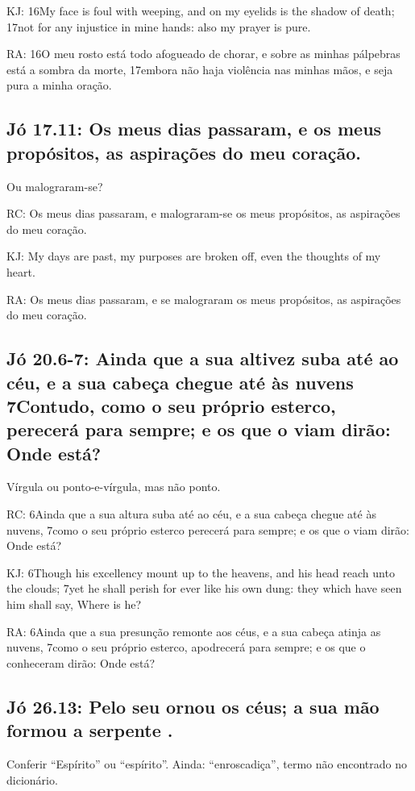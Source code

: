 KJ: 16My face is foul with weeping, and on my eyelids is the shadow of death; 17not for any injustice in mine hands: also my prayer is pure.

RA: 16O meu rosto está todo afogueado de chorar, e sobre as minhas pálpebras está a sombra da morte, 17embora não haja violência nas minhas mãos, e seja pura a minha oração.

\subsection{Jó 17.11: Os meus dias passaram, e  os meus propósitos, as aspirações do meu coração.}
Ou malograram-se?

RC: Os meus dias passaram, e malograram-se os meus propósitos, as aspirações do meu coração.

KJ: My days are past, my purposes are broken off, even the thoughts of my heart.

RA: Os meus dias passaram, e se malograram os meus propósitos, as aspirações do meu coração.

\subsection{Jó 20.6-7: Ainda que a sua altivez suba até ao céu, e a sua cabeça chegue até às nuvens 7Contudo, como o seu próprio esterco, perecerá para sempre; e os que o viam dirão: Onde está?}
Vírgula ou ponto-e-vírgula, mas não ponto.

RC: 6Ainda que a sua altura suba até ao céu, e a sua cabeça chegue até às nuvens, 7como o seu próprio esterco perecerá para sempre; e os que o viam dirão: Onde está?

KJ: 6Though his excellency mount up to the heavens, and his head reach unto the clouds; 7yet he shall perish for ever like his own dung: they which have seen him shall say, Where is he?

RA: 6Ainda que a sua presunção remonte aos céus, e a sua cabeça atinja as nuvens, 7como o seu próprio esterco, apodrecerá para sempre; e os que o conheceram dirão: Onde está?

\subsection{Jó 26.13: Pelo seu  ornou os céus; a sua mão formou a serpente .}

Conferir ``Espírito'' ou ``espírito''. Ainda: ``enroscadiça'', termo não encontrado no dicionário.

